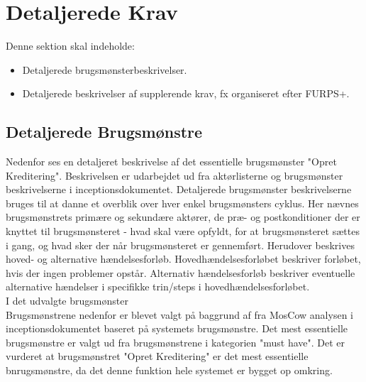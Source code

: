 \section{Detaljerede Krav}
Denne sektion skal indeholde:

\begin{itemize}
    \item Detaljerede brugsmønsterbeskrivelser.
    \item Detaljerede beskrivelser af supplerende krav, fx organiseret efter FURPS+.
\end{itemize}{}

\subsection{Detaljerede Brugsmønstre}
Nedenfor ses en detaljeret beskrivelse af det essentielle brugsmønster "Opret Kreditering".
Beskrivelsen er udarbejdet ud fra aktørlisterne og brugsmønster beskrivelserne i inceptionsdokumentet. Detaljerede brugsmønster beskrivelserne bruges til at danne et overblik over hver enkel brugsmønsters cyklus. Her nævnes brugsmønstrets primære og sekundære aktører, de præ- og postkonditioner der er knyttet til brugsmønsteret - hvad skal være opfyldt, for at brugsmønsteret sættes i gang, og hvad sker der når brugsmønsteret er gennemført. Herudover beskrives hoved- og alternative hændelsesforløb. Hovedhændelsesforløbet beskriver forløbet, hvis der ingen problemer opstår. Alternativ hændelsesforløb beskriver eventuelle alternative hændelser i specifikke trin/steps i hovedhændelsesforløbet. \\
I det udvalgte brugsmønster 
\\
Brugsmønstrene nedenfor er blevet valgt på baggrund af fra MosCow analysen i inceptionsdokumentet baseret på systemets brugsmønstre. Det mest essentielle brugsmønstre er valgt ud fra brugsmønstrene i kategorien "must have". Det er vurderet at brugsmønstret "Opret Kreditering" er det mest essentielle bnrugsmønstre, da det denne funktion hele systemet er bygget op omkring.\\
\\




